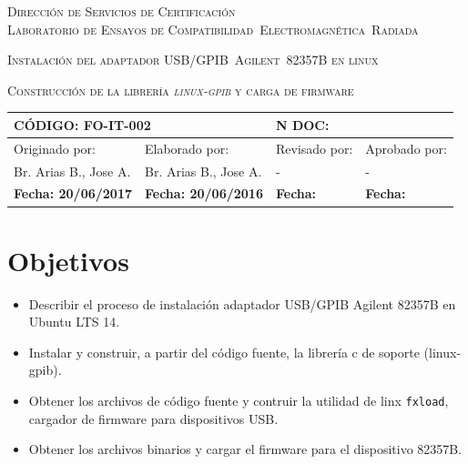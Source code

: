 \documentclass[paper=letter,oneside,fontsize=11pt, parskip=full]{scrartcl}
\begin{document}
	
	
	\begin{center} 
		
		\vspace{10cm}
		
		\begin{Large} 
			\textsc{Dirección de Servicios de Certificación}
			\\[5pt]
			\textsc{Laboratorio de Ensayos de Compatibilidad~Electromagnética~Radiada}
		\end{Large}
		
		\vspace{10cm}
		
		
		\begin{LARGE}			
			\textsc{Instalación del adaptador USB/GPIB~Agilent~82357B en linux}
		\end{LARGE}			
		
		\begin{large}			
			\textsc{Construcción de la librería \emph{linux-gpib} y carga de firmware}
		\end{large}	

		
		\begin{table}[!b]
			\begin{tabularx}{\linewidth}{|X|X|X|X|}	
				\hline				
				\multicolumn{2}{|l|}{\textbf{CÓDIGO}: FO-IT-002} & \multicolumn{2}{l|}{\textbf{N DOC:}} \\
				\hline
				Originado por:	& 	Elaborado por: & 
				Revisado por: 	& 	Aprobado por: \\
				\hline
				Br. Arias B., Jose A. & Br. Arias B., Jose A. & - & - \\
				\hline
				\textbf{Fecha: 20/06/2017 } & 
				\textbf{Fecha: 20/06/2016} & 
				\textbf{Fecha: } &
				\textbf{Fecha: } \\				
				\hline
			\end{tabularx}	
		\end{table}	
		
	\end{center}
	
	
	\clearpage
	
	\tableofcontents
	
	\section{Objetivos}
		\begin{itemize}
			\item  Describir el proceso de instalación adaptador USB/GPIB Agilent 82357B en Ubuntu LTS 14.
			\item Instalar y construir, a partir del código fuente, la librería c de soporte (linux-gpib).
			\item Obtener los archivos de código fuente y contruir la utilidad de linx \texttt{fxload}, cargador de firmware para dispositivos USB.
			\item Obtener los archivos binarios y cargar el firmware para el dispositivo 82357B.
		\end{itemize}
		
\end{document}
